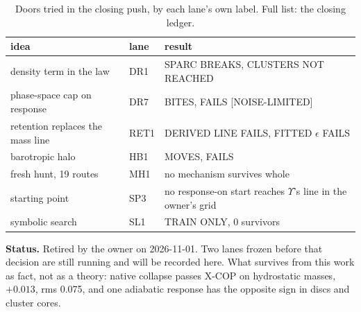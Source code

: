 \documentclass[10pt]{article}
\begin{document}
\begin{table}[h]\centering\small
\caption{Doors tried in the closing push, by each lane's own label. Full list: the closing ledger.}
\begin{tabular}{>{\raggedright\arraybackslash}p{5.6cm}l>{\raggedright\arraybackslash}p{7.2cm}}
\toprule
idea & lane & result\\
\midrule
density term in the law & DR1 & SPARC BREAKS, CLUSTERS NOT REACHED\\
phase-space cap on response & DR7 & BITES, FAILS [NOISE-LIMITED]\\
retention replaces the mass line & RET1 & DERIVED LINE FAILS, FITTED $\epsilon$ FAILS\\
barotropic halo & HB1 & MOVES, FAILS\\
fresh hunt, 19 routes & MH1 & no mechanism survives whole\\
starting point & SP3 & no response-on start reaches $\Upsilon$'s line in the owner's grid\\
symbolic search & SL1 & TRAIN ONLY, 0 survivors\\
\bottomrule
\end{tabular}
\end{table}
\textbf{Status.} Retired by the owner on 2026-11-01. Two lanes frozen before that decision are still running and will be recorded here. What survives from this work as fact, not as a theory: native collapse passes X-COP on hydrostatic masses, $+0.013$, rms 0.075, and one adiabatic response has the opposite sign in discs and cluster cores.
\end{document}
